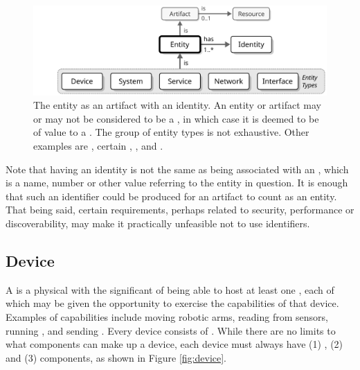 \begin{figure}[ht!]
  \centering
  \includegraphics[scale=0.9]{figures/entity}
  \caption{
    The entity as an artifact with an identity.
    An entity or artifact may or may not be considered to be a , in which case it is deemed to be of value to a .
    The group of entity types is not exhaustive.
    Other examples are , certain , ,  and .
  }
  \label{fig:entity}
\end{figure}

\vspace*{0.9mm}

Note that having an identity is not the same as being associated with an , which is a name, number or other value referring to the entity in question.
It is enough that such an identifier could be produced for an artifact to count as an entity.
That being said, certain  requirements, perhaps related to security, performance or discoverability, may make it practically unfeasible not to use identifiers.

\subsection{Device}
\label{sec:reference-model:device}

A  is a physical  with the significant  of being able to host at least one , each of which may be given the opportunity to exercise the capabilities of that device.
Examples of capabilities include moving robotic arms, reading from sensors, running , and sending . 
Every device consists of .
While there are no limits to what components can make up a device, each device must always have (1) , (2)  and (3)  components, as shown in Figure \ref{fig:device}.

